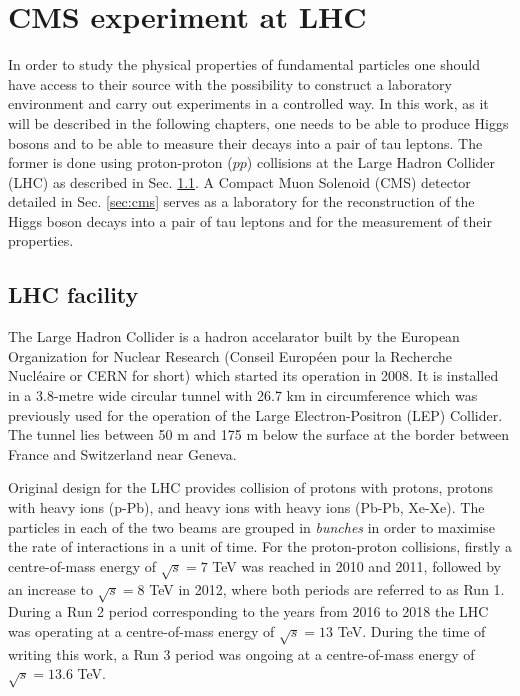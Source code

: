 \chapter{CMS experiment at LHC}\label{sec:cms-exp}

In order to study the physical properties of fundamental particles one should have access to their source with the possibility to construct a laboratory environment and carry out experiments in a controlled way. In this work, as it will be described in the following chapters, one needs to be able to produce Higgs bosons and to be able to measure their decays into a pair of tau leptons. The former is done using proton-proton ($pp$) collisions at the Large Hadron Collider (LHC) as described in Sec. \ref{sec:lhc}. A Compact Muon Solenoid (CMS) detector detailed in Sec. \ref{sec:cms} serves as a laboratory for the reconstruction of the Higgs boson decays into a pair of tau leptons and for the measurement of their properties.

\section{LHC facility}\label{sec:lhc}

The Large Hadron Collider \cite{Evans:2008zzb} is a hadron accelarator built by the European Organization for Nuclear Research (Conseil Europ\'een pour la Recherche Nucl\'eaire or CERN for short) which started its operation in 2008. It is installed in a 3.8-metre wide circular tunnel with 26.7 km in circumference which was previously used for the operation of the Large Electron-Positron (LEP) Collider. The tunnel lies between 50 m and 175 m below the surface at the border between France and Switzerland near Geneva.

Original design for the LHC provides collision of protons with protons, protons with heavy ions (p-Pb), and heavy ions with heavy ions (Pb-Pb, Xe-Xe). The particles in each of the two beams are grouped in \textit{bunches} in order to maximise the rate of interactions in a unit of time. For the proton-proton collisions, firstly a centre-of-mass energy of $\sqrt{s} = 7$ TeV was reached in 2010 and 2011, followed by an increase to $\sqrt{s} = 8$ TeV in 2012, where both periods are referred to as Run 1. During a Run 2 period corresponding to the years from 2016 to 2018 the LHC was operating at a centre-of-mass energy of $\sqrt{s} = 13$ TeV. During the time of writing this work, a Run 3 period was ongoing at a centre-of-mass energy of $\sqrt{s} = 13.6$ TeV. 

